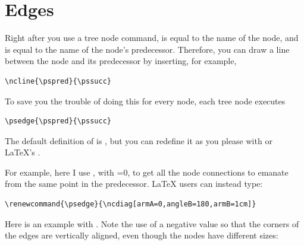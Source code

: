 \documentclass[fontsize=11pt,english,BCOR=10mm,DIV=12,bibliography=totoc,parskip=false,
   headings=small, headinclude=false,footinclude=false,oneside]{pst-doc}
\begin{document}


\section{Edges}

Right after you use a tree node command,  is equal to the name of the
node, and  is equal to the name of the node's predecessor. Therefore,
you can draw a line between the node and its predecessor by inserting, for
example,

\begin{lstlisting}[style=syntax]
\ncline{\pspred}{\pssucc}
\end{lstlisting}

To save you the trouble of doing this for every node, each tree node executes
\begin{lstlisting}[style=syntax]
  \psedge{\pspred}{\pssucc}
\end{lstlisting}
The default definition of  is , but you can redefine it as
you please with  or \LaTeX's .

For example, here I use , with =0, to get all the node
connections to emanate from the same point in the predecessor. \LaTeX{} users can instead type:
\begin{lstlisting}[style=syntax]
\renewcommand{\psedge}{\ncdiag[armA=0,angleB=180,armB=1cm]}
\end{lstlisting}


\begin{LTXexample}[pos=l,width=0.4\linewidth]
  \def\psedge{\ncdiag[armA=0,angleB=180,armB=1cm]}
\end{LTXexample}

Here is an example with . Note the use of a negative  value
so that the corners of the edges are vertically aligned, even though the nodes
have different sizes:
\end{document}
